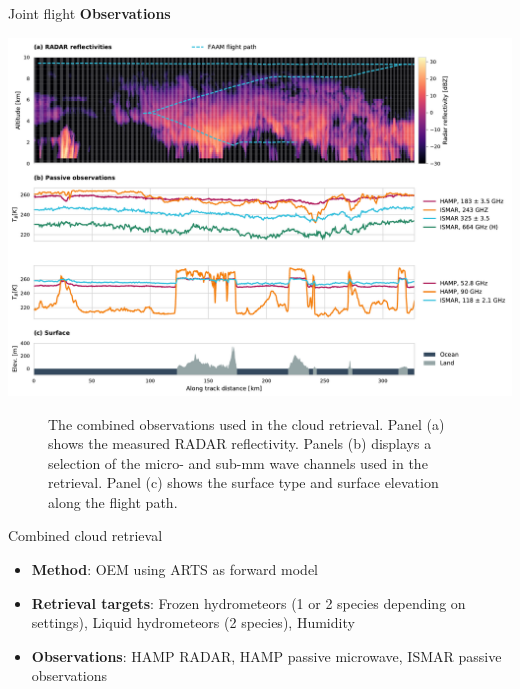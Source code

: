 \documentclass[final,hyperref={pdfpagelabels=false}]{beamer}
\begin{document}
\begin{frame}
\begin{columns}[t]
\begin{column}{.48\linewidth}
\begin{block}{Joint flight}
           \textbf{Observations}

            \includegraphics[width=1.0\textwidth]{../plots/observations_combined}
            \begin{figure}
            \centering
            \caption{The combined observations used in the cloud retrieval. Panel (a) shows
              the measured RADAR reflectivity. Panels (b) displays a selection of the micro-
              and sub-mm wave channels used in the retrieval. Panel (c) shows the surface
              type and surface elevation along the flight path.}
            \end{figure}
        \end{block}

          
        \vspace{-2cm}
        \begin{block}{Combined cloud retrieval}

          \begin{itemize}
          \item \textbf{Method}: OEM using ARTS  \citep{arts} as forward model
          \item \textbf{Retrieval targets}: Frozen hydrometeors (1 or 2 species
            depending on settings), Liquid hydrometeors (2 species), Humidity
          \item \textbf{Observations}: HAMP RADAR, HAMP passive microwave, 
               ISMAR passive observations
          \end{itemize}\\[1cm]


\end{block}
\end{column}
\end{columns}
\end{frame}
\end{document}
